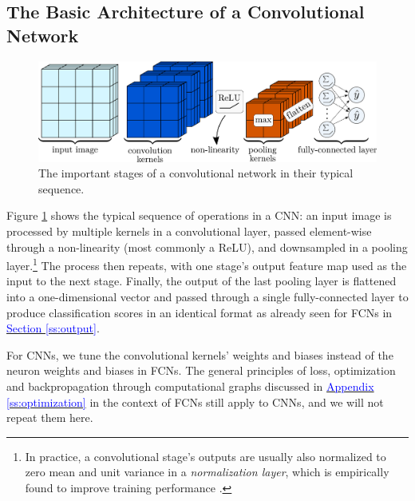 \documentclass[11pt, a4paper]{article}
\newcommand{\myhref}[2]{\hyperref[#1]{\textcolor{blue}{#2}}}
\begin{document}

\subsection{The Basic Architecture of a Convolutional Network} \label{ss:cnn-architecture}

\begin{figure}[htb!]
    \centering
    \includegraphics[width=0.95\linewidth]{vector/cnn-architecture.pdf}
    \caption{The important stages of a convolutional network in their typical sequence.}
    \label{fig:cnn-architecture}
\end{figure}

Figure \ref{fig:cnn-architecture} shows the typical sequence of operations in a CNN: an input image is processed by multiple kernels in a convolutional layer, passed element-wise through a non-linearity (most commonly a ReLU), and downsampled in a pooling layer.\footnote{In practice, a convolutional stage's outputs are usually also normalized to zero mean and unit variance in a \textit{normalization layer}, which is empirically found to improve training performance \cite{homl}.} The process then repeats, with one stage's output feature map used as the input to the next stage.
Finally, the output of the last pooling layer is flattened into a one-dimensional vector and passed through a single fully-connected layer to produce classification scores in an identical format as already seen for FCNs in \myhref{ss:output}{Section \ref{ss:output}}.

For CNNs, we tune the convolutional kernels' weights and biases instead of the neuron weights and biases in FCNs.
The general principles of loss, optimization and backpropagation through computational graphs discussed in \myhref{ss:optimization}{Appendix \ref{ss:optimization}} in the context of FCNs still apply to CNNs, and we will not repeat them here.

\end{document}
